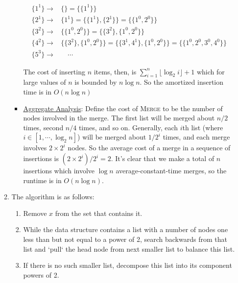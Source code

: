 \documentclass{article}
\begin{document}
\begin{enumerate}
\begin{enumerate}
\begin{itemize}
            \begin{equation*}
            \begin{aligned}
                \{1^1\} \rightarrow& \big\{\big\} = \big\{\{1^1\}\big\} \\
                \{2^1\} \rightarrow& \big\{1^1\big\} = \big\{\{1^1\}, \{2^1\}\big\} = \big\{\{1^0, 2^0\}\big\} \\
                \{3^2\} \rightarrow& \big\{\{1^0, 2^0\}\big\} = \big\{\{3^2\}, \{1^0, 2^0\}\big\} \\
                \{4^2\} \rightarrow& \big\{\{3^2\}, \{1^0, 2^0\}\big\} = \big\{\{3^1, 4^1\}, \{1^0, 2^0\}\big\} = \big\{\{1^0, 2^0, 3^0, 4^0\}\big\} \\
                \{5^3\} \rightarrow& \quad \cdots
            \end{aligned}
            \end{equation*}

            The cost of inserting $n$ items, then, is $\sum_{i = 1}^n \lfloor \log_2 i \rfloor + 1$ which for large values of $n$ is bounded by $n \log n$. So the amortized insertion time is in $O(n \log n)$

            \item \underline{Aggregate Analysis}: Define the cost of \textsc{Merge} to be the number of nodes involved in the merge. The first list will be merged about $n / 2$ times, second $n / 4$ times, and so on. Generally, each $i$th list (where $i \in [1, \cdots, \log_2{n}]$) will be merged about $1 / 2^i$ times, and each merge involves $2 \times 2^i$ nodes. So the average cost of a merge in a sequence of insertions is $(2 \times 2^i) / 2^i = 2$. It's clear that we make a total of $n$ insertions which involve $\log n$ average-constant-time merges, so the runtime is in $O(n \log n)$.
        \end{itemize}
    \item The algorithm is as follows:
        \begin{enumerate}
        \item Remove $x$ from the set that contains it.
        \item While the data structure contains a list with a number of nodes one less than but not equal to a power of 2, search backwards from that list and `pull` the head node from next smaller list to balance this list.
        \item If there is no such smaller list, decompose this list into its component powers of 2.
        \end{enumerate}


\end{enumerate}
\end{enumerate}
\end{document}
